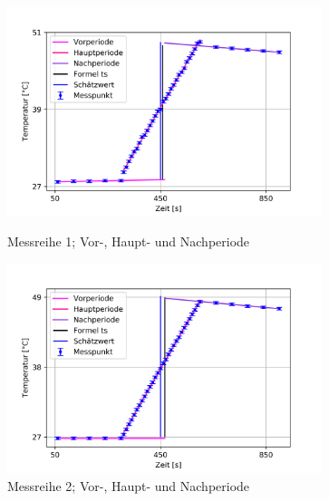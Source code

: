 \documentclass[bibliography=totocnumbered]{scrartcl}
\begin{document}
	\begin{figure}[ht!]
		\centering
		\begin{minipage}[ht!]{0.45\linewidth}
			\centering
			\includegraphics[width=260pt]{fotos/gpr1/S_T1_M1.png}
			\caption[Messreihe 1.2]{Messreihe 1; Vor-, Haupt- und Nachperiode}
			\label{Abb: M1 Sara}
		\end{minipage}
		\hfill
		\begin{minipage}[ht!]{0.45\linewidth}
			\centering
			\includegraphics[width=260pt]{fotos/gpr1/S_T1_M2.png}
			\caption[Messreihe 2.2]{Messreihe 2; Vor-, Haupt- und Nachperiode}
			\label{Abb: M2 Sara}
		\end{minipage}
	\end{figure}
	\newpage
\end{document}
